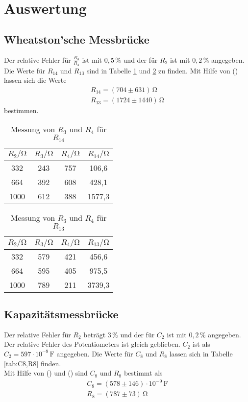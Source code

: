 \section{Auswertung}
\label{sec:Auswertung}

\subsection{Wheatston'sche Messbrücke}
Der relative Fehler für $\frac{R_3}{R_4}$ ist mit $0,5\,\%$ und der für $R_2$ ist mit $0,2\,\%$ angegeben. Die Werte für $R_{14}$ und $R_{13}$ sind in
Tabelle \ref{tab:R14} und \ref{tab:R13} zu finden. Mit Hilfe von () lassen sich die Werte
\begin{gather*}
  R_{14} = (704 \pm 631)\,\unit{\ohm} \\
  R_{13} = (1724 \pm 1440)\,\unit{\ohm}
\end{gather*}
bestimmen.

\begin{table}
  \centering
  \caption{Messung von $R_3$ und $R_4$ für $R_{14}$}
  \label{tab:R14}
  \begin{tabular}{c c c c}
    \toprule
    $R_2/\unit{\ohm}$ & $R_3/\unit{\ohm}$ & $R_4/\unit{\ohm}$ & $R_{14}/\unit{\ohm}$ \\
    \midrule
     332 & 243 & 757 &  106,6 \\
     664 & 392 & 608 &  428,1 \\
    1000 & 612 & 388 & 1577,3 \\
    \bottomrule
  \end{tabular}
\end{table}

\begin{table}
  \centering
  \caption{Messung von $R_3$ und $R_4$ für $R_{13}$}
  \label{tab:R13}
  \begin{tabular}{c c c c}
    \toprule
    $R_2/\unit{\ohm}$ & $R_3/\unit{\ohm}$ & $R_4/\unit{\ohm}$ & $R_{13}/\unit{\ohm}$ \\
    \midrule
     332 & 579 & 421 &  456,6 \\
     664 & 595 & 405 &  975,5 \\
    1000 & 789 & 211 & 3739,3 \\
    \bottomrule
  \end{tabular}
\end{table}

\subsection{Kapazitätsmessbrücke}
Der relative Fehler für $R_2$ beträgt $3\,\%$ und der für $C_2$ ist mit $0,2 \,\%$ angegeben. Der relative Fehler des Potentiometers ist gleich geblieben.
$C_2$ ist als $C_2 = 597 \cdot 10^{-9}\,\unit{\farad}$ angegeben. Die Werte für $C_8$ und $R_8$ lassen sich in Tabelle \ref{tab:C8,R8} finden.\\
Mit Hilfe von () und () sind $C_8$ und $R_8$ bestimmt als
\begin{gather*}
  C_8 = (578 \pm 146)\cdot 10^{-9} \,\unit{\farad} \\
  R_8 = (787 \pm 73)\,\unit{\ohm}
\end{gather*}

